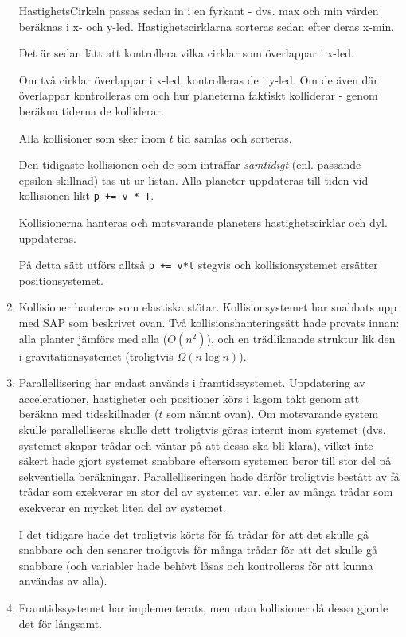 \begin{enumerate}
        HastighetsCirkeln passas sedan in i en fyrkant - dvs.
        max och min värden beräknas i x- och y-led.
        Hastighetscirklarna sorteras sedan efter deras x-min.

        Det är sedan lätt att kontrollera vilka cirklar som överlappar
        i x-led.

        Om två cirklar överlappar i x-led, kontrolleras de i y-led.
        Om de även där överlappar kontrolleras om och hur
        planeterna faktiskt kolliderar - genom beräkna tiderna de kolliderar.

        Alla kollisioner som sker inom $t$ tid samlas och sorteras.

        Den tidigaste kollisionen och de som inträffar \textit{samtidigt}
        (enl. passande epsilon-skillnad) tas ut ur listan.
        Alla planeter uppdateras till tiden vid kollisionen likt
        \verb#p += v * T#.

        Kollisionerna hanteras och motsvarande planeters hastighetscirklar
        och dyl. uppdateras. 

        På detta sätt utförs alltså \verb#p += v*t# stegvis och
        kollisionsystemet ersätter positionsystemet.

    \item Kollisioner hanteras som elastiska stötar.
        Kollisionsystemet har snabbats upp med SAP som beskrivet ovan.
        Två kollisionshanteringsätt hade provats innan:
        alla planter jämförs med alla ($O(n^2)$),
        och en trädliknande struktur lik den i gravitationsystemet
        (troligtvis $\Omega(n\log n)$).
    \item Parallellisering har endast används i framtidssystemet.
        Uppdatering av accelerationer, hastigheter och positioner
        körs i lagom takt genom att beräkna med tidsskillnader
        ($t$ som nämnt ovan).
        Om  motsvarande system skulle parallelliseras skulle dett troligtvis
        göras internt inom systemet (dvs. systemet skapar trådar
        och väntar på att dessa ska bli klara), vilket inte säkert
        hade gjort systemet snabbare eftersom systemen beror till stor del
        på sekventiella beräkningar.
        Parallelliseringen hade därför troligtvis bestått av få
        trådar som exekverar en stor del av systemet var, eller
        av många trådar som exekverar en mycket liten del av systemet.

        I det tidigare hade det troligtvis körts för få trådar för
        att det skulle gå snabbare och den senarer troligtvis för
        många trådar för att det skulle gå snabbare (och variabler
        hade behövt låsas och kontrolleras för att kunna användas av alla).

    \item Framtidssystemet har implementerats, men utan kollisioner
        då dessa gjorde det för långsamt.
\end{enumerate}

